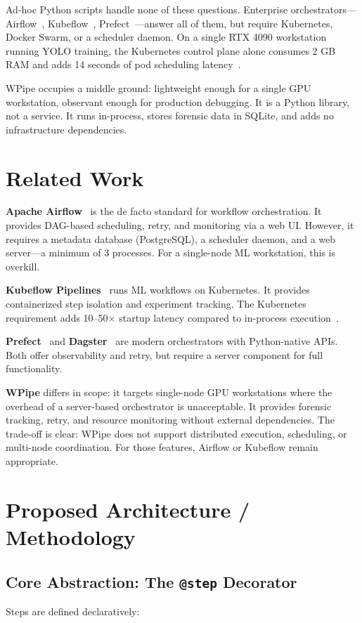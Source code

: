 \documentclass[10pt,twocolumn,letterpaper]{article}
\begin{document}
Ad-hoc Python scripts handle none of these questions. Enterprise orchestrators---Airflow~\cite{airflow2014}, Kubeflow~\cite{kubeflow2019}, Prefect~\cite{prefect2018}---answer all of them, but require Kubernetes, Docker Swarm, or a scheduler daemon. On a single RTX 4090 workstation running YOLO training, the Kubernetes control plane alone consumes 2 GB RAM and adds 14 seconds of pod scheduling latency~\cite{invoker2026}.

WPipe occupies a middle ground: lightweight enough for a single GPU workstation, observant enough for production debugging. It is a Python library, not a service. It runs in-process, stores forensic data in SQLite, and adds no infrastructure dependencies.

\section{Related Work}
\textbf{Apache Airflow}~\cite{airflow2014} is the de facto standard for workflow orchestration. It provides DAG-based scheduling, retry, and monitoring via a web UI. However, it requires a metadata database (PostgreSQL), a scheduler daemon, and a web server---a minimum of 3 processes. For a single-node ML workstation, this is overkill.

\textbf{Kubeflow Pipelines}~\cite{kubeflow2019} runs ML workflows on Kubernetes. It provides containerized step isolation and experiment tracking. The Kubernetes requirement adds 10--50$\times$ startup latency compared to in-process execution~\cite{invoker2026}.

\textbf{Prefect}~\cite{prefect2018} and \textbf{Dagster}~\cite{dagster2019} are modern orchestrators with Python-native APIs. Both offer observability and retry, but require a server component for full functionality.

\textbf{WPipe} differs in scope: it targets single-node GPU workstations where the overhead of a server-based orchestrator is unacceptable. It provides forensic tracking, retry, and resource monitoring without external dependencies. The trade-off is clear: WPipe does not support distributed execution, scheduling, or multi-node coordination. For those features, Airflow or Kubeflow remain appropriate.

\section{Proposed Architecture / Methodology}

\subsection{Core Abstraction: The \texttt{@step} Decorator}
Steps are defined declaratively:
\end{document}
